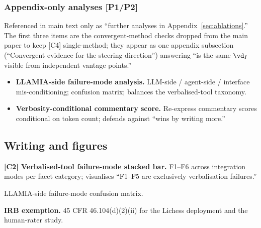\subsubsection*{Appendix-only analyses [P1/P2]}

Referenced in main text only as ``further analyses in
Appendix~\ref{sec:ablations}.'' The first three items are the
convergent-method checks dropped from the main paper to keep [C4]
single-method; they appear as one appendix subsection (``Convergent
evidence for the steering direction'') answering ``is the same
$\vd_I$ visible from independent vantage points.''

\begin{itemize}[leftmargin=*]
%

    \item \textbf{LLAMIA-side failure-mode analysis.}
    LLM-side / agent-side / interface mis-conditioning; confusion
    matrix; balances the verbalised-tool taxonomy.
    \item \textbf{Verbosity-conditional commentary score.}
    Re-express commentary scores conditional on token count; defends
    against ``wins by writing more.''
\end{itemize}

\subsection{Writing and figures}
\label{sec:todo_writing}
\textbf{[C2] Verbalised-tool failure-mode stacked bar.}
    F1--F6 across integration modes per facet category;
    visualises ``F1--F5 are exclusively verbalisation failures.''


\item LLAMIA-side failure-mode confusion matrix.

\item \textbf{IRB exemption.} 45 CFR 46.104(d)(2)(ii) for the Lichess deployment and the human-rater study.


